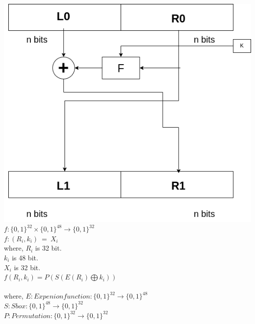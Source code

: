 \documentclass[11pt]{article}
\begin{document}
\includegraphics[scale=0.35]{Images/L4/L4_Cryupto_FN.drawio.png}\\
$f : \{0,1\}^{32} \times \{0,1\}^{48} \rightarrow \{0,1\}^{32}$\\
$f:(R_i,k_i)\ =\ X_i$\\
where,
$R_i$ is 32 bit.\\
$k_i$ is 48 bit.\\
$X_i$ is 32 bit.\\

$ f(R_i,k_i) = P(S(E(R_i) \bigoplus k_i))$\\\\
where,
$E : Expenion function : \{0,1\}^{32} \rightarrow \{0,1\}^{48}$\\
$S : Sbox : \{0,1\}^{48} \rightarrow \{0,1\}^{32} $\\
$P : Permutation : \{0,1\}^{32} \rightarrow \{0,1\}^{32}$\\\\
\end{document}

